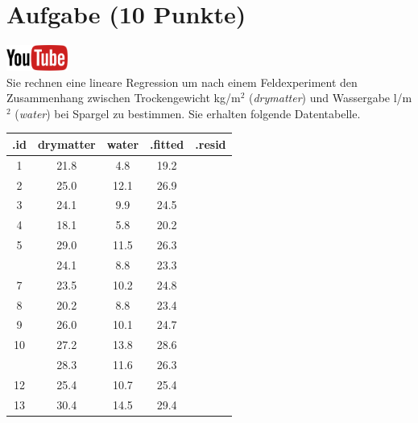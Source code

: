 \documentclass[a4paper, 10pt]{scrartcl}\usepackage[]{graphicx}\usepackage[]{xcolor}
\newenvironment{knitrout}{}{} %
\begin{document}
 
\clearpage

\section{Aufgabe \hfill (10 Punkte)}

\hfill\href{https://youtu.be/dyQlYV9nOqY}{\includegraphics[width =
  2cm]{img/youtube}}\\[1Ex]

Sie rechnen eine lineare Regression um nach einem Feldexperiment den
Zusammenhang zwischen Trockengewicht kg/m$^2$ (\textit{drymatter}) und
Wassergabe l/m$^2$ (\textit{water}) bei Spargel zu bestimmen. Sie erhalten
folgende Datentabelle.

\begin{knitrout}
\color{fgcolor}\begin{table}[!h]
\centering\begingroup\fontsize{12}{14}\selectfont

\begin{tabular}{ccccc}
\toprule
.id & drymatter & water & .fitted & .resid\\
\midrule
1 & 21.8 & 4.8 & 19.2 & \\
2 & 25.0 & 12.1 & 26.9 & \\
3 & 24.1 & 9.9 & 24.5 & \\
4 & 18.1 & 5.8 & 20.2 & \\
5 & 29.0 & 11.5 & 26.3 & \\
\addlinespace
6 & 24.1 & 8.8 & 23.3 & \\
7 & 23.5 & 10.2 & 24.8 & \\
8 & 20.2 & 8.8 & 23.4 & \\
9 & 26.0 & 10.1 & 24.7 & \\
10 & 27.2 & 13.8 & 28.6 & \\
\addlinespace
11 & 28.3 & 11.6 & 26.3 & \\
12 & 25.4 & 10.7 & 25.4 & \\
13 & 30.4 & 14.5 & 29.4 & \\
\bottomrule
\end{tabular}
\endgroup{}
\end{table}

\end{knitrout}
\end{document}
